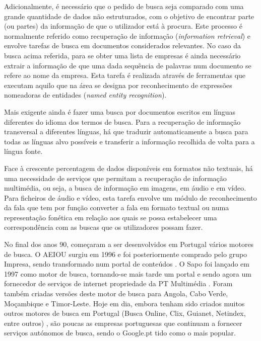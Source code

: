 \begin{multicols}{2}
Adicionalmente, é necessário que o pedido de busca seja comparado com uma grande quantidade de dados não estruturados,
com o objetivo de encontrar parte (ou partes) da informação de que o utilizador está à procura. 
Este processo é normalmente referido como recuperação de informação (\textit{information retrieval}) 
e envolve tarefas de busca em documentos considerados relevantes. 
No caso da busca acima referida, para se obter uma lista de empresas é ainda necessário extrair a informação 
de que uma dada sequência de palavras num documento se refere ao nome da empresa. 
Esta tarefa é realizada através de ferramentas que executam aquilo que na área se designa por 
reconhecimento de expressões nomeadoras de entidades (\textit{named entity recognition}).


Mais exigente ainda é fazer uma busca por documentos escritos em línguas diferentes do idioma dos termos de busca. 
Para a recuperação de informação transversal a diferentes línguas, há que traduzir automaticamente a busca para todas as línguas alvo possíveis e transferir a informação recolhida de volta para a língua fonte. 

Face à crescente percentagem de dados disponíveis em formatos não textuais, há uma necessidade de serviços que permitam a recuperação de informação multimédia, 
ou seja, a busca de informação em imagens, em áudio e em vídeo. 
Para ficheiros de áudio e vídeo, esta tarefa envolve um módulo de reconhecimento da fala que tem por função converter a fala em formato textual ou numa representação fonética em relação aos quais se possa estabelecer uma correspondência com as buscas
que os utilizadores possam fazer.

No final dos anos 90, começaram a ser desenvolvidos em Portugal vários motores de busca. 
O AEIOU surgiu em 1996 e foi posteriormente comprado pelo grupo Impresa, sendo transformado num portal de conteúdos \cite{aeiou}. 
O Sapo foi lançado em 1997 como motor de busca, tornando-se mais tarde um portal e sendo agora um fornecedor de serviços de internet propriedade da PT Multimédia \cite{sapo}. 
Foram também criadas versões deste motor de busca para Angola, Cabo Verde, Moçambique e Timor-Leste. 
Hoje em dia, embora tenham sido criados muitos outros motores de busca em Portugal (Busca Online, Clix, Guianet, Netindex, entre outros) \cite{colossus}, 
são poucas as empresas portuguesas que continuam a fornecer serviços autónomos de busca, sendo o Google.pt tido como o mais popular.


\end{multicols}
